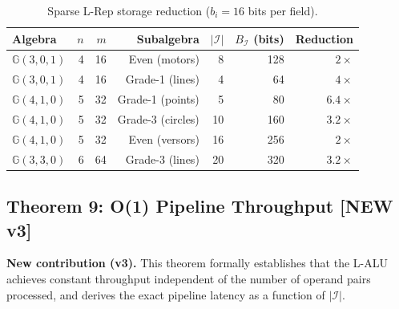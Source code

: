 \documentclass[11pt,a4paper]{article}
\theoremstyle{definition}
\theoremstyle{plain}
\theoremstyle{remark}
\newcommand{\GA}{\mathbb{G}}
\begin{document}
\begin{table}[h]
\centering
\caption{Sparse L-Rep storage reduction ($b_i=16$ bits per field).}
\label{tab:sparse}
\small
\begin{tabular}{lrrrrrr}
\toprule
Algebra & $n$ & $m$ & Subalgebra & $|\mathcal{I}|$ & $B_\mathcal{I}$ (bits) & Reduction \\
\midrule
$\GA(3,0,1)$ & 4 & 16 & Even (motors) & 8 & 128 & $2\times$ \\
$\GA(3,0,1)$ & 4 & 16 & Grade-1 (lines) & 4 & 64 & $4\times$ \\
$\GA(4,1,0)$ & 5 & 32 & Grade-1 (points) & 5 & 80 & $6.4\times$ \\
$\GA(4,1,0)$ & 5 & 32 & Grade-3 (circles) & 10 & 160 & $3.2\times$ \\
$\GA(4,1,0)$ & 5 & 32 & Even (versors) & 16 & 256 & $2\times$ \\
$\GA(3,3,0)$ & 6 & 64 & Grade-3 (lines) & 20 & 320 & $3.2\times$ \\
\bottomrule
\end{tabular}
\end{table}

\subsection{Theorem 9: O(1) Pipeline Throughput [NEW v3]}
\label{sec:pipeline}

\begin{newcontrib}
\textbf{New contribution (v3).}
This theorem formally establishes that the L-ALU achieves constant
throughput independent of the number of operand pairs processed,
and derives the exact pipeline latency as a function of $|\mathcal{I}|$.
\end{newcontrib}
\end{document}
